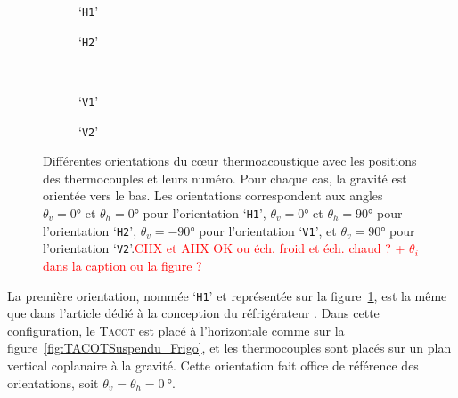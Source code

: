 \begin{figure}[!ht]
    \centering
	\begin{subfigure}{.47\textwidth}
		\centering
		
		\caption{`\texttt{H1}'}
		\label{fig:OrientationCore_H1}
	\end{subfigure}		%
	\begin{subfigure}{.47\textwidth}
		\centering
		
		\caption{`\texttt{H2}'}
		\label{fig:OrientationCore_H2}
	\end{subfigure} \\ \vspace{1cm}
	\begin{subfigure}{.47\textwidth}
		\centering
		
		\caption{`\texttt{V1}'}
		\label{fig:OrientationCore_V1}
	\end{subfigure} %
	\begin{subfigure}{.47\textwidth}
		\centering
		
		\caption{`\texttt{V2}'}
		\label{fig:OrientationCore_V2}
	\end{subfigure}   
    \caption{Différentes orientations du c\oe{}ur thermoacoustique avec les positions des thermocouples et leurs numéro. Pour chaque cas, la gravité est orientée vers le bas. Les orientations correspondent aux angles  $\theta_v=\ang{0}$ et $\theta_h=\ang{0}$ pour l'orientation `\texttt{H1}',  $\theta_v=\ang{0}$ et $\theta_h=\ang{+90}$ pour l'orientation `\texttt{H2}',  $\theta_v=\ang{-90}$ pour l'orientation `\texttt{V1}', et  $\theta_v=\ang{+90}$ pour l'orientation `\texttt{V2}'.\textcolor{red}{CHX et AHX OK ou éch. froid et éch. chaud ? + $\theta_i$ dans la caption ou la figure ?}}
    \label{fig:OrientationCore} %
\end{figure}

\medskip

La première orientation, nommée `\texttt{H1}' et représentée sur la figure~\ref{fig:OrientationCore_H1}, est la même que dans l'article dédié à la conception du réfrigérateur \cite{ramadan_design_2021}. Dans cette configuration, le \textsc{Tacot} est placé à l'horizontale comme sur la figure~\ref{fig:TACOTSuspendu_Frigo}, et les thermocouples sont placés sur un plan vertical coplanaire à la gravité. Cette orientation fait office de référence des orientations, soit $\theta_v=\theta_h=\qty{0}{\degree}$.


